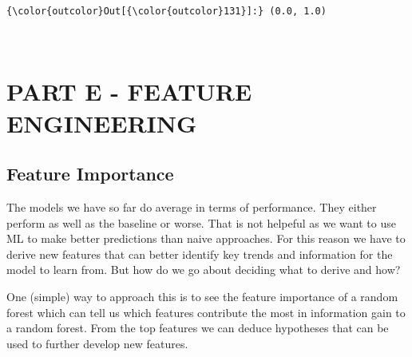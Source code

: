 \documentclass[11pt]{article}
\begin{document}
\begin{Verbatim}[commandchars=\\\{\}]
{\color{outcolor}Out[{\color{outcolor}131}]:} (0.0, 1.0)
\end{Verbatim}
            
    \begin{center}
    \end{center}
    { \hspace*{\fill} \\}
    
    \section{PART E - FEATURE
ENGINEERING}\label{part-e---feature-engineering}

\subsection{Feature Importance}\label{feature-importance}

The models we have so far do average in terms of performance. They
either perform as well as the baseline or worse. That is not helpeful as
we want to use ML to make better predictions than naive approaches. For
this reason we have to derive new features that can better identify key
trends and information for the model to learn from. But how do we go
about deciding what to derive and how?

One (simple) way to approach this is to see the feature importance of a
random forest which can tell us which features contribute the most in
information gain to a random forest. From the top features we can deduce
hypotheses that can be used to further develop new features.
\end{document}
